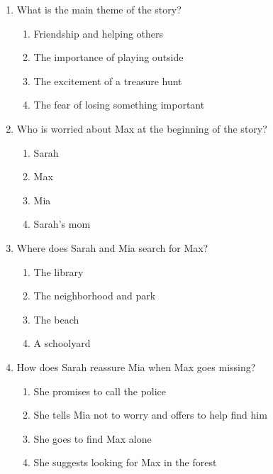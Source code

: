 \documentclass[12pt]{article}
\begin{document}
\begin{enumerate}

    \item What is the main theme of the story?
    \begin{enumerate}[label=\Alph*.]
        \item Friendship and helping others
        \item The importance of playing outside
        \item The excitement of a treasure hunt
        \item The fear of losing something important
    \end{enumerate}
    \vspace{0.5cm}

    \item Who is worried about Max at the beginning of the story?
    \begin{enumerate}[label=\Alph*.]
        \item Sarah
        \item Max
        \item Mia
        \item Sarah's mom
    \end{enumerate}
    \vspace{0.5cm}

    \item Where does Sarah and Mia search for Max?
    \begin{enumerate}[label=\Alph*.]
        \item The library
        \item The neighborhood and park
        \item The beach
        \item A schoolyard
    \end{enumerate}
    \vspace{0.5cm}

    \item How does Sarah reassure Mia when Max goes missing?
    \begin{enumerate}[label=\Alph*.]
        \item She promises to call the police
        \item She tells Mia not to worry and offers to help find him
        \item She goes to find Max alone
        \item She suggests looking for Max in the forest
    \end{enumerate}
    \vspace{0.5cm}


\end{enumerate}
\end{document}
